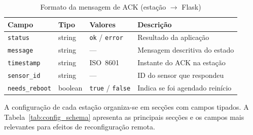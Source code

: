 \documentclass[12pt,a4paper]{report}
\begin{document}
\begin{table}[H]
\centering\small
\caption{Formato da mensagem de ACK (estação $\to$ Flask)}
\label{tab:msg_ack}
\begin{tabularx}{\linewidth}{lllX}
\toprule
\textbf{Campo} & \textbf{Tipo} & \textbf{Valores} & \textbf{Descrição} \\
\midrule
\texttt{status}       & string  & \texttt{ok} / \texttt{error} & Resultado da aplicação \\
\texttt{message}      & string  & ---  & Mensagem descritiva do estado \\
\texttt{timestamp}    & string  & ISO~8601 & Instante do ACK na estação \\
\texttt{sensor\_id}   & string  & ---  & ID do sensor que respondeu \\
\texttt{needs\_reboot}& boolean & \texttt{true} / \texttt{false} & Indica se foi agendado reinício \\
\bottomrule
\end{tabularx}
\end{table}

A configuração de cada estação organiza-se em secções com campos tipados. A Tabela~\ref{tab:config_schema} apresenta as principais secções e os campos mais relevantes para efeitos de reconfiguração remota.
\end{document}
